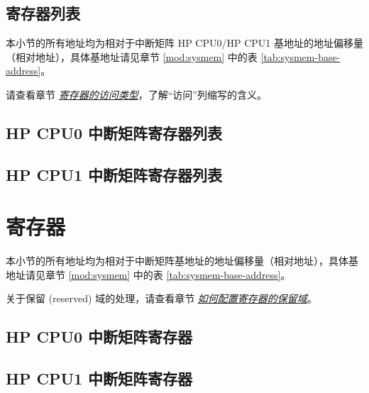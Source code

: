 \documentclass[main\_\_CN.tex]{subfiles}
\begin{document}


\newpage
\hypertarget{intmtrx--reg-summ}{}
\begin{landscape}
\section{寄存器列表}
\label{sec:{intmtrx--reg-summ}}

本小节的所有地址均为相对于中断矩阵 HP CPU0/HP CPU1 基地址的地址偏移量（相对地址），具体基地址请见章节 \ref{mod:sysmem} \textit{} 中的表 \ref{tab:sysmem-base-address}。


请查看章节 \hyperref[glossary-access-types]{\textit{寄存器的访问类型}}，了解“访问”列缩写的含义。

\subsection{HP CPU0 中断矩阵寄存器列表}
\label{sec: cpu0-intmtrx-reg-summ}



\subsection{HP CPU1 中断矩阵寄存器列表}
\label{sec: cpu1-intmtrx-reg-summ}


\end{landscape}




\newpage
\section{寄存器}

本小节的所有地址均为相对于中断矩阵基地址的地址偏移量（相对地址），具体基地址请见章节 \ref{mod:sysmem} \textit{} 中的表 \ref{tab:sysmem-base-address}。

关于保留 (reserved) 域的处理，请查看章节 \hyperref[programming-reserved-field]{\textit{如何配置寄存器的保留域}}。


\subsection{HP CPU0 中断矩阵寄存器}
\label{sec: cpu0-intmtrx-reg}


\subsection{HP CPU1 中断矩阵寄存器}
\label{sec: cpu1-intmtrx-reg}

\end{document}
